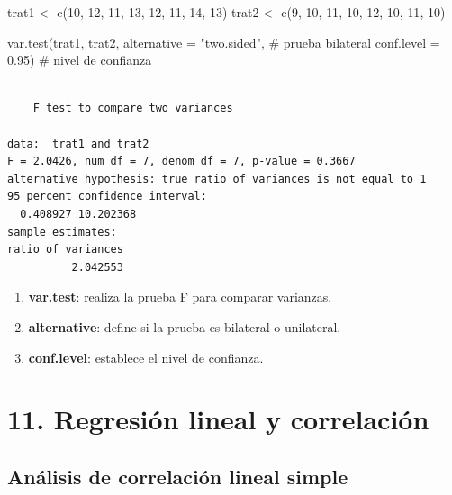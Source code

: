 \documentclass[
  spanish,
  letterpaper,
]{book}
\newenvironment{Shaded}{\begin{snugshade}}{\end{snugshade}}
\newcommand{\AttributeTok}[1]{\textcolor[rgb]{0.40,0.45,0.13}{#1}}
\newcommand{\CommentTok}[1]{\textcolor[rgb]{0.37,0.37,0.37}{#1}}
\newcommand{\DecValTok}[1]{\textcolor[rgb]{0.68,0.00,0.00}{#1}}
\newcommand{\FloatTok}[1]{\textcolor[rgb]{0.68,0.00,0.00}{#1}}
\newcommand{\FunctionTok}[1]{\textcolor[rgb]{0.28,0.35,0.67}{#1}}
\newcommand{\NormalTok}[1]{\textcolor[rgb]{0.00,0.23,0.31}{#1}}
\newcommand{\OtherTok}[1]{\textcolor[rgb]{0.00,0.23,0.31}{#1}}
\newcommand{\StringTok}[1]{\textcolor[rgb]{0.13,0.47,0.30}{#1}}
\begin{document}
\begin{Shaded}
\begin{Highlighting}[]
\NormalTok{trat1 }\OtherTok{\textless{}{-}} \FunctionTok{c}\NormalTok{(}\DecValTok{10}\NormalTok{, }\DecValTok{12}\NormalTok{, }\DecValTok{11}\NormalTok{, }\DecValTok{13}\NormalTok{, }\DecValTok{12}\NormalTok{, }\DecValTok{11}\NormalTok{, }\DecValTok{14}\NormalTok{, }\DecValTok{13}\NormalTok{)}
\NormalTok{trat2 }\OtherTok{\textless{}{-}} \FunctionTok{c}\NormalTok{(}\DecValTok{9}\NormalTok{, }\DecValTok{10}\NormalTok{, }\DecValTok{11}\NormalTok{, }\DecValTok{10}\NormalTok{, }\DecValTok{12}\NormalTok{, }\DecValTok{10}\NormalTok{, }\DecValTok{11}\NormalTok{, }\DecValTok{10}\NormalTok{)}

\FunctionTok{var.test}\NormalTok{(trat1, trat2,}
         \AttributeTok{alternative =} \StringTok{"two.sided"}\NormalTok{, }\CommentTok{\# prueba bilateral}
         \AttributeTok{conf.level =} \FloatTok{0.95}\NormalTok{)         }\CommentTok{\# nivel de confianza}
\end{Highlighting}
\end{Shaded}

\begin{verbatim}

    F test to compare two variances

data:  trat1 and trat2
F = 2.0426, num df = 7, denom df = 7, p-value = 0.3667
alternative hypothesis: true ratio of variances is not equal to 1
95 percent confidence interval:
  0.408927 10.202368
sample estimates:
ratio of variances 
          2.042553 
\end{verbatim}

\begin{enumerate}
\def\labelenumi{\arabic{enumi}.}
\item
  \textbf{var.test}: realiza la prueba F para comparar varianzas.
\item
  \textbf{alternative}: define si la prueba es bilateral o unilateral.
\item
  \textbf{conf.level}: establece el nivel de confianza.
\end{enumerate}

\part{11. Regresión lineal y correlación}


\chapter{Análisis de correlación lineal
simple}\label{anuxe1lisis-de-correlaciuxf3n-lineal-simple}
\end{document}
